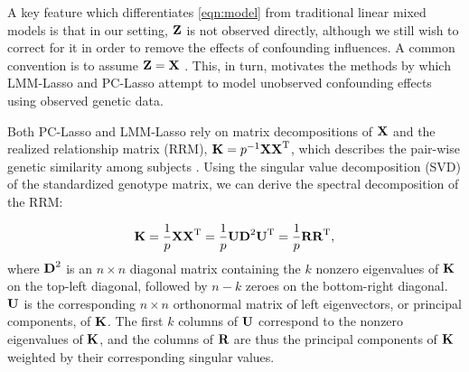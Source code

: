 A key feature which differentiates \eqref{eqn:model} from traditional linear mixed models is that in our setting, $\textbf{Z}$ is not observed directly, although we still wish to correct for it in order to remove the effects of confounding influences. A common convention is to assume $\textbf{Z} = \textbf{X}$ \citep{wang2018multiplex, lippert2011fast, yang2014advantages}.  This, in turn, motivates the methods by which LMM-Lasso and PC-Lasso attempt to model unobserved confounding effects using observed genetic data.

Both PC-Lasso and LMM-Lasso rely on matrix decompositions of $\textbf{X}$ and the realized relationship matrix (RRM), $\textbf{K} = p^{-1} \textbf{X} \textbf{X}^{\text{T}}$, which describes the pair-wise genetic similarity among subjects \citep{hayes2009increased}. Using the singular value decomposition (SVD) of the standardized genotype matrix, we can derive the spectral decomposition of the RRM: 

\begin{equation}
    \label{eqn:k}
    \textbf{K} = \frac{1}{p} \textbf{X} \textbf{X}^{\text{T}} = \frac{1}{p} \textbf{U} \textbf{D}^2 \textbf{U}^{\text{T}} = \frac{1}{p} \textbf{R} \textbf{R}^{\text{T}},
\end{equation}
where $\textbf{D}^2$ is an $n \times n$ diagonal matrix containing the $k$ nonzero eigenvalues of $\textbf{K}$ on the top-left diagonal, followed by $n - k$ zeroes on the bottom-right diagonal. $\textbf{U}$ is the corresponding $n \times n$ orthonormal matrix of left eigenvectors, or principal components, of $\textbf{K}$. The first $k$ columns of $\textbf{U}$ correspond to the nonzero eigenvalues of $\textbf{K}$, and the columns of $\textbf{R}$ are thus the principal components of $\textbf{K}$ weighted by their corresponding singular values. 


